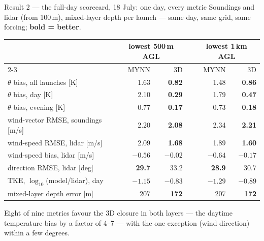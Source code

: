 \documentclass[10pt,aspectratio=169]{beamer}
\begin{document}
\begin{frame}{Result 2 --- the full-day scorecard, 18 July: one day, every metric}
  Soundings and lidar (from 100\,m), mixed-layer depth per launch --- same
  day, same grid, same forcing; \textbf{bold = better}.
  \vspace{1ex}
  \begin{center}
  \begin{tabular}{@{}lrrcrr@{}}
    \toprule
    & \multicolumn{2}{c}{lowest 500\,m AGL} & &
      \multicolumn{2}{c}{lowest 1\,km AGL} \\
    \cmidrule{2-3}\cmidrule{5-6}
    & MYNN & 3D & & MYNN & 3D \\
    \midrule
    $\theta$ bias, all launches [K] & 1.63 & \textbf{0.82} & & 1.48 & \textbf{0.86} \\
    $\theta$ bias, day [K] & 2.10 & \textbf{0.29} & & 1.79 & \textbf{0.47} \\
    $\theta$ bias, evening [K] & 0.77 & \textbf{0.17} & & 0.73 & \textbf{0.18} \\
    wind-vector RMSE, soundings [m/s] & 2.20 & \textbf{2.08} & & 2.34 & \textbf{2.21} \\
    wind-speed RMSE, lidar [m/s] & 2.09 & \textbf{1.68} & & 1.89 & \textbf{1.60} \\
    wind-speed bias, lidar [m/s] & $-0.56$ & $\mathbf{-0.02}$ & & $-0.64$ & $\mathbf{-0.17}$ \\
    direction RMSE, lidar [deg] & \textbf{29.7} & 33.2 & & \textbf{28.9} & 30.7 \\
    TKE, $\log_{10}$(model/lidar), day & $-1.15$ & $\mathbf{-0.83}$ & & $-1.29$ & $\mathbf{-0.89}$ \\
    mixed-layer depth error [m] & 207 & \textbf{172} & & 207 & \textbf{172} \\
    \bottomrule
  \end{tabular}
  \end{center}
  \vspace{1ex}
  Eight of nine metrics favour the 3D closure in both layers --- the daytime
  temperature bias by a factor of 4--7 --- with the one exception (wind
  direction) within a few degrees.
\end{frame}
\end{document}
